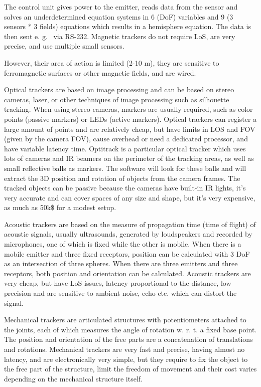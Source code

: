 \documentclass[a4paper]{article}
\begin{document}
The control unit gives power to the emitter, reads data from the sensor
and solves an underdetermined equation systems in 6 (DoF) variables and
9 (3 sensors * 3 fields) equations which results in a hemisphere
equation.
The data is then sent e.
g.
~via RS-232.
Magnetic trackers do
not require LoS, are very precise, and use multiple small sensors.

However, their area of action is limited (2-10 m), they are sensitive to
ferromagnetic surfaces or other magnetic fields, and are wired.

Optical trackers are based on image processing and can be based on
stereo cameras, laser, or other techniques of image processing such as
silhouette tracking.
When using stereo cameras, markers are usually
required, such as color points (passive markers) or LEDs (active
markers).
Optical trackers can register a large amount of points and are
relatively cheap, but have limits in LOS and FOV (given by the camera
FOV), cause overhead or need a dedicated processor, and have variable
latency time.
Optitrack is a particular optical tracker which uses lots
of cameras and IR beamers on the perimeter of the tracking areas, as
well as small reflective balls as markers.
The software will look for
these balls and will extract the 3D position and rotation of objects
from the camera frames.
The tracked objects can be passive because the
cameras have built-in IR lights, it's very accurate and can cover spaces
of any size and shape, but it's very expensive, as much as 50k\$ for a
modest setup.

Acoustic trackers are based on the measure of propagation time (time of
flight) of acoustic signals, usually ultrasounds, generated by
loudspeakers and recorded by microphones, one of which is fixed while
the other is mobile.
When there is a mobile emitter and three fixed
receptors, position can be calculated with 3 DoF as an intersection of
three spheres.
When there are three emitters and three receptors, both
position and orientation can be calculated.
Acoustic trackers are very
cheap, but have LoS issues, latency proportional to the distance, low
precision and are sensitive to ambient noise, echo etc.
which can
distort the signal.

Mechanical trackers are articulated structures with potentiometers
attached to the joints, each of which measures the angle of rotation
w.
r.
t.
a fixed base point.
The position and orientation of the free
parts are a concatenation of translations and rotations.
Mechanical
trackers are very fast and precise, having almost no latency, and are
electronically very simple, but they require to fix the object to the
free part of the structure, limit the freedom of movement and their cost
varies depending on the mechanical structure itself.
\end{document}
